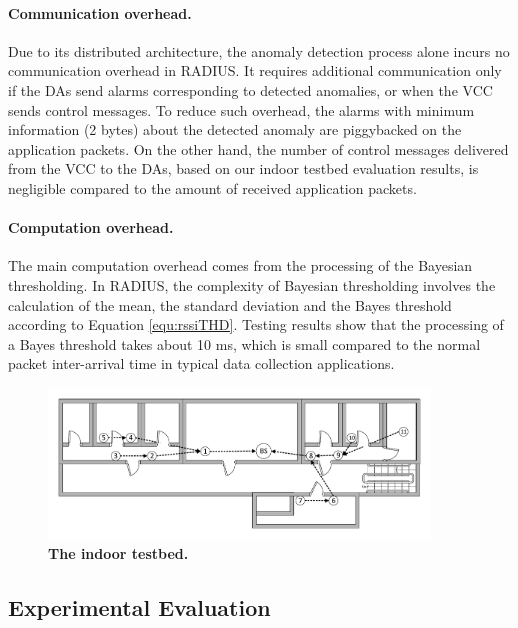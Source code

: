 \paragraph{Communication overhead.} Due to its distributed architecture, the anomaly detection process alone incurs no communication overhead in RADIUS. It requires additional communication only if the DAs send alarms corresponding to detected anomalies, or when the VCC sends control messages. To reduce such overhead, the alarms with minimum information (2 bytes) about the detected anomaly are piggybacked on the application packets. On the other hand, the number of control messages delivered from the VCC to the DAs, based on our indoor testbed evaluation results, is negligible compared to the amount of received application packets.

\paragraph{Computation overhead.} The main computation overhead comes from the processing of the Bayesian thresholding. In RADIUS, the complexity of Bayesian thresholding involves the calculation of the mean, the standard deviation and the Bayes threshold according to Equation \ref{equ:rssiTHD}. Testing results show that the processing of a Bayes threshold takes about 10 ms, which is small compared to the normal packet inter-arrival time in typical data collection applications.


\begin{figure}[t]
	\centering
	\includegraphics[width=1\linewidth, height=4cm]{floor-plan}
	\vspace{-0.85cm}
	\caption{\textbf{The indoor testbed.}}
	\label{fig:floor-plan}
	\vspace{-0.35cm}
\end{figure}

\subsection{Experimental Evaluation} \label{sec:evaluation}


